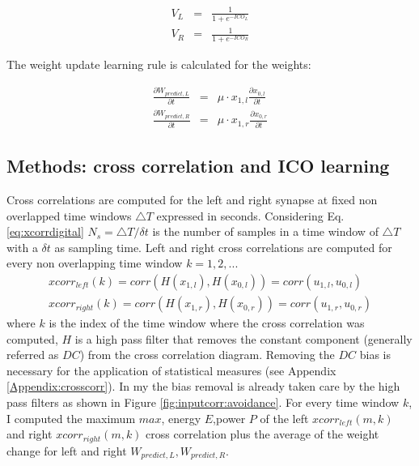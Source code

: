 \begin{eqnarray}
V_{L}&=& \frac{1}{1+e^{-ICO_{L}}}\\
V_{R}&=& \frac{1}{1+e^{-ICO_{R}}}
\end{eqnarray}

The weight update learning rule is calculated for the weights:

\begin{eqnarray}
\frac{\partial W_{predict,L}}{\partial t}&=& \mu \cdot x_{1,l} \frac{\partial x_{0,l}}{\partial t} \label{eq:maxcorr:wleft}\\
\frac{\partial W_{predict,R}}{\partial t}&=& \mu \cdot x_{1,r} \frac{\partial x_{0,r}}{\partial t} \label{eq:maxcorr:wright}
\end{eqnarray}


\subsection{Methods: cross correlation and ICO learning}
Cross correlations are computed for the left and right synapse at fixed non
overlapped time windows $\triangle T$ expressed in seconds.
Considering Eq.\ref{eq:xcorrdigital} $N_{s}=\triangle T/\delta t$ is the number
 of samples in a time window of $\triangle T$ with a $\delta t$ as sampling time.
Left and right cross correlations are computed for every non overlapping time window $k=1,2,...$
\begin{eqnarray}
xcorr_{left}(k)=corr(H(x_{1,l}),H(x_{0,l}))=corr(u_{1,l},u_{0,l})\\
xcorr_{right}(k)=corr(H(x_{1,r}),H(x_{0,r}))=corr(u_{1,r},u_{0,r})
\end{eqnarray}
where $k$ is the index of the time window where the cross correlation was computed,
$H$ is a high pass filter that removes the constant component (generally referred as $DC$)
from the cross correlation diagram. Removing the $DC$ bias is necessary for the application
of statistical measures (see Appendix \ref{Appendix:crosscorr}).
In my the bias removal is already taken care by the high pass filters as shown in Figure \ref{fig:inputcorr:avoidance}.
For every time window $k$, I computed the maximum $max$, energy $E$,power $P$ of the
left $xcorr_{left}(m,k)$ and right $xcorr_{right}(m,k)$ cross correlation plus the average of
the weight change for left and right $W_{predict,L},W_{predict,R}$.
